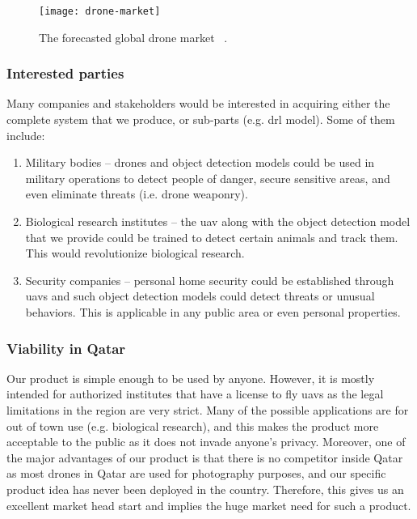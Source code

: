 \begin{figure}[tbp] 
        \centering
        \texttt{[image: drone-market]}
        \caption[The forecasted global drone market.]
        {The forecasted global drone market~%
        \cite[Fig.~2]{Mic14}.} 
        \label{fig:drone-market} 
\end{figure}
	
\subsubsection{Interested parties}
	Many companies and stakeholders would be interested in acquiring either the
	complete system that we produce, or sub-parts (e.g. \gls{drl} model). Some of them include:
	\begin{enumerate}
		\item Military bodies -- drones and object detection models could 
		be used in military operations to detect people of danger, secure 
		sensitive areas, and even eliminate threats (i.e. drone weaponry).
		
		\item Biological research institutes -- 
                    the \gls{uav} along with the object
		detection model that we provide could be trained to detect certain animals 
		and track them. This would revolutionize biological research.
		
		\item Security companies -- personal home security could be established through
		\glspl{uav} and such object detection models could detect threats or unusual
		behaviors. This is applicable in any public area or even personal properties.		
		
	\end{enumerate}

\subsubsection{Viability in Qatar}
	Our product is simple enough to be used by anyone. However, it is mostly intended for 
	authorized institutes that have a license to fly \glspl{uav} as the legal limitations 
	in the region are very strict. 
	Many of the possible applications are for out of town use (e.g. biological research), 
	and this makes the product more acceptable to the public as it does not invade anyone's privacy.
	Moreover, one of the major advantages of our product is that there is no competitor 
	inside Qatar as most drones in Qatar are used for photography purposes, and our
	specific product idea has never been deployed in the country. Therefore, this gives us an excellent 
	market head start and implies the huge market need for such a product.

